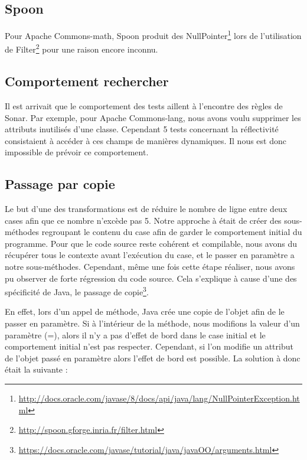 \documentclass[a4paper]{article}
\begin{document}
\subsection{Spoon}
\par Pour Apache Commons-math, Spoon produit des NullPointer\footnote{\url{http://docs.oracle.com/javase/8/docs/api/java/lang/NullPointerException.html}} lors de l'utilisation de Filter\footnote{\url{http://spoon.gforge.inria.fr/filter.html}} pour une raison encore inconnu.

\subsection{Comportement rechercher}
\par Il est arrivait que le comportement des tests aillent à l'encontre des règles de Sonar. Par exemple, pour Apache Commons-lang, nous avons voulu supprimer les attributs inutilisés d'une classe. Cependant 5 tests concernant la réflectivité consistaient à accéder à ces champs de manières dynamiques. Il nous est donc impossible de prévoir ce comportement.

\subsection{Passage par copie}
\par Le but d'une des transformations est de réduire le nombre de ligne entre deux cases afin que ce nombre n'excède pas 5. Notre approche à était de créer des sous-méthodes regroupant le contenu du case afin de garder le comportement initial du programme. Pour que le code source reste cohérent et compilable, nous avons du récupérer tous le contexte avant l'exécution du case, et le passer en paramètre a notre sous-méthodes. Cependant, même une fois cette étape réaliser, nous avons pu observer de forte régression du code source. Cela s'explique à cause d'une des spécificité de Java, le passage de copie\footnote{\url{https://docs.oracle.com/javase/tutorial/java/javaOO/arguments.html}}.
\\
\par 
En effet, lors d'un appel de méthode, Java crée une copie de l'objet afin de le passer en paramètre. Si à l'intérieur de la méthode, nous modifions la valeur d'un paramètre (=), alors il n'y a pas d'effet de bord dans le case initial et le comportement initial n'est pas respecter. Cependant, si l'on modifie un attribut de l'objet passé en paramètre alors l'effet de bord est possible. La solution à donc était la suivante :
\end{document}
